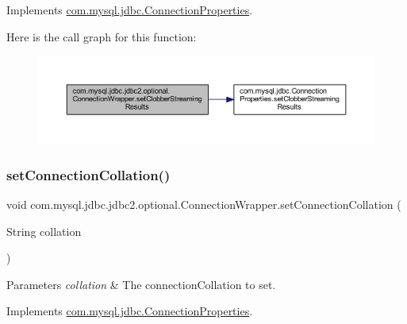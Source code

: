 Implements \mbox{\hyperlink{interfacecom_1_1mysql_1_1jdbc_1_1_connection_properties_a3bb976fbcde1b60e4dae84b49320de5f}{com.\+mysql.\+jdbc.\+Connection\+Properties}}.

Here is the call graph for this function\+:
\nopagebreak
\begin{figure}[H]
\begin{center}
\leavevmode
\includegraphics[width=350pt]{classcom_1_1mysql_1_1jdbc_1_1jdbc2_1_1optional_1_1_connection_wrapper_a89ce1b22b67b5682dd976a11ccae9a3d_cgraph}
\end{center}
\end{figure}
\mbox{\label{classcom_1_1mysql_1_1jdbc_1_1jdbc2_1_1optional_1_1_connection_wrapper_a663eda436c1079c803042e8496d17549}} 
\subsubsection{\texorpdfstring{set\+Connection\+Collation()}{setConnectionCollation()}}
{\footnotesize\ttfamily void com.\+mysql.\+jdbc.\+jdbc2.\+optional.\+Connection\+Wrapper.\+set\+Connection\+Collation (\begin{DoxyParamCaption}\item[{String}]{collation }\end{DoxyParamCaption})}


\begin{DoxyParams}{Parameters}
{\em collation} & The connection\+Collation to set. \\
\hline
\end{DoxyParams}


Implements \mbox{\hyperlink{interfacecom_1_1mysql_1_1jdbc_1_1_connection_properties_a69729667beed7cc9989d0b736d2cc28d}{com.\+mysql.\+jdbc.\+Connection\+Properties}}.

